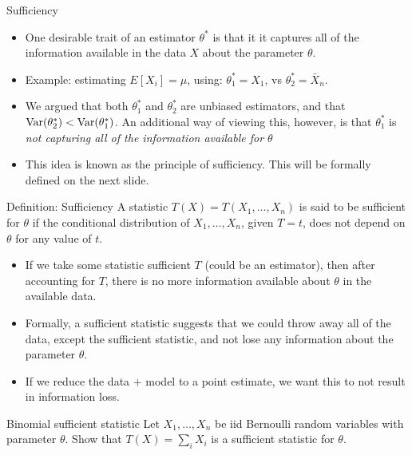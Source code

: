 \begin{frame}[allowframebreaks]{Sufficiency}
  \begin{itemize}
    \item One desirable trait of an estimator $\theta^*$ is that it it captures all of the information available in the data $X$ about the parameter $\theta$.
    \item Example: estimating $E[X_i] = \mu$, using: $\theta^*_1 = X_1$, vs $\theta^*_2 = \bar{X}_n$.
    \item We argued that both $\theta^*_1$ and $\theta^*_2$ are unbiased estimators, and that $\mathrm{Var}(\theta^*_2) < \mathrm{Var}(\theta^*_1)$. An additional way of viewing this, however, is that $\theta^*_1$ is \emph{not capturing all of the information available for $\theta$}
    \item This idea is known as the principle of \alert{sufficiency}. This will be formally defined on the next slide.
  \end{itemize}

  \framebreak

  \begin{block}{Definition: Sufficiency}
    A statistic $T(X) = T(X_1, \ldots, X_n)$ is said to be \alert{sufficient} for $\theta$ if the conditional distribution of $X_1, \ldots, X_n$, given $T = t$, does not depend on $\theta$ for any value of $t$.
  \end{block}

  \begin{itemize}
    \item If we take some statistic sufficient $T$ (could be an estimator), then after accounting for $T$, there is no more information available about $\theta$ in the available data.
    \item Formally, a sufficient statistic suggests that we could throw away all of the data, except the sufficient statistic, and not lose any information about the parameter $\theta$.
    \item If we reduce the data + model to a point estimate, we want this to not result in information loss.
  \end{itemize}

  \framebreak

  \begin{exampleblock}{Binomial sufficient statistic}
    Let $X_1, \ldots, X_n$ be iid Bernoulli random variables with parameter $\theta$. Show that $T(X) = \sum_i X_i$ is a \alert{sufficient statistic} for $\theta$.


\end{exampleblock}
\end{frame}
